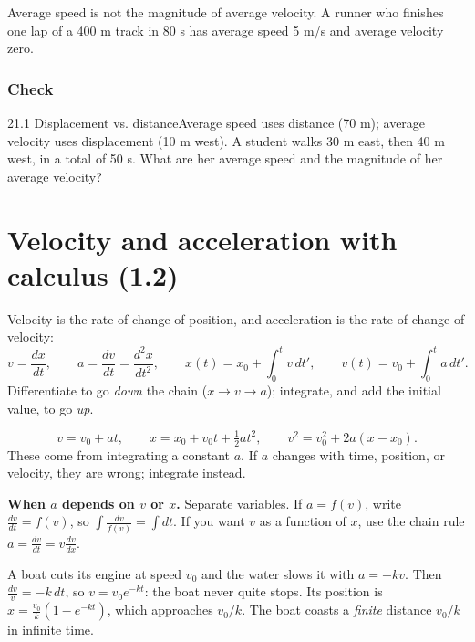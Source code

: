 \documentclass[11pt]{article}
\begin{document}
\begin{trap}
Average speed is not the magnitude of average velocity. A runner who finishes one lap of a 400 m track in 80 s has average speed 5 m/s and average velocity zero.
\end{trap}

\subsubsection{Check}\mbox{}

\begin{q}{2}{1.1 Displacement vs. distance}{Average speed uses distance (70 m); average velocity uses displacement (10 m west).}
A student walks 30 m east, then 40 m west, in a total of 50 s. What are her average speed and the magnitude of her average velocity?
\end{q}

\section{Velocity and acceleration with calculus (1.2)}\label{sec:2}

Velocity is the rate of change of position, and acceleration is the rate of change of velocity:
\[ v = \frac{dx}{dt}, \qquad a = \frac{dv}{dt} = \frac{d^2x}{dt^2}, \qquad x(t) = x_0 + \int_0^t v\,dt', \qquad v(t) = v_0 + \int_0^t a\,dt'. \]
Differentiate to go \emph{down} the chain ($x \to v \to a$); integrate, and add the initial value, to go \emph{up}.

\begin{keyidea}
\vspace{-6pt}
\[ v = v_0 + at, \qquad x = x_0 + v_0 t + \tfrac12 a t^2, \qquad v^2 = v_0^2 + 2a(x - x_0). \]
These come from integrating a constant $a$. If $a$ changes with time, position, or velocity, they are wrong; integrate instead.
\end{keyidea}

\textbf{When $a$ depends on $v$ or $x$.} Separate variables. If $a = f(v)$, write $\frac{dv}{dt} = f(v)$, so $\int \frac{dv}{f(v)} = \int dt$. If you want $v$ as a function of $x$, use the chain rule $a = \frac{dv}{dt} = v\frac{dv}{dx}$.

\begin{example}
A boat cuts its engine at speed $v_0$ and the water slows it with $a = -kv$. Then $\frac{dv}{v} = -k\,dt$, so $v = v_0 e^{-kt}$: the boat never quite stops. Its position is $x = \frac{v_0}{k}\left(1 - e^{-kt}\right)$, which approaches $v_0/k$. The boat coasts a \emph{finite} distance $v_0/k$ in infinite time.
\end{example}
\end{document}
